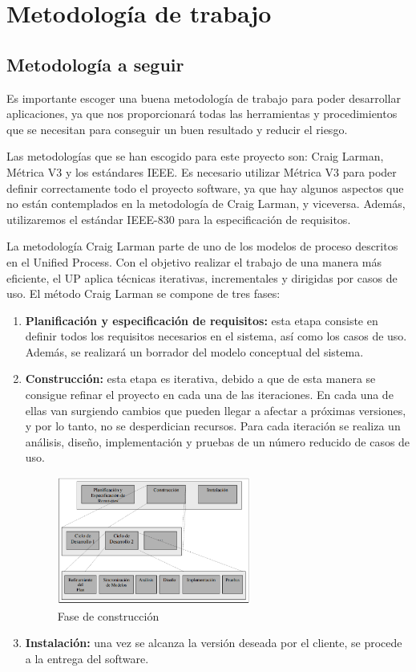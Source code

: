 


\section{Metodología de trabajo}
\subsection {Metodología a seguir}
\par Es importante escoger una buena metodología de trabajo para poder desarrollar aplicaciones, ya que nos proporcionará todas las herramientas y procedimientos que se necesitan para conseguir un buen resultado y reducir el riesgo.
\par Las metodologías que se han escogido para este proyecto son: Craig Larman, Métrica V3 y los estándares IEEE. Es necesario utilizar Métrica V3 para poder definir correctamente todo el proyecto software, ya que hay algunos aspectos que no están contemplados en la metodología de Craig Larman, y viceversa. Además, utilizaremos el estándar IEEE-830 para la especificación de requisitos.
\par La metodología Craig Larman parte de uno de los modelos de proceso descritos en el Unified Process. Con el objetivo realizar el trabajo de una manera más eficiente, el UP aplica técnicas iterativas, incrementales y dirigidas por casos de uso. El método Craig Larman se compone de tres fases:
\begin{enumerate}[1.]
\item \textbf{Planificación y especificación de requisitos:} esta etapa consiste en definir todos los requisitos necesarios en el sistema, así como los casos de uso. Además, se realizará un borrador del modelo conceptual del sistema.
\item \textbf{Construcción:} esta etapa es iterativa, debido a que de esta manera se consigue refinar el proyecto en cada una de las iteraciones. En cada una de ellas van surgiendo cambios que pueden llegar a afectar a próximas versiones, y por lo tanto, no se desperdician recursos. Para cada iteración se realiza un análisis, diseño, implementación y pruebas de un número reducido de casos de uso.
\begin{figure}[H]
\begin{center}
\includegraphics[width=0.6\textwidth]{./img/Metodologia.png}
\end{center}
\caption{Fase de construcción}
\label{tab:horasTotales}
\end{figure}


\item \textbf{Instalación:} una vez se alcanza la versión deseada por el cliente, se procede a la entrega del software.
\end{enumerate}
